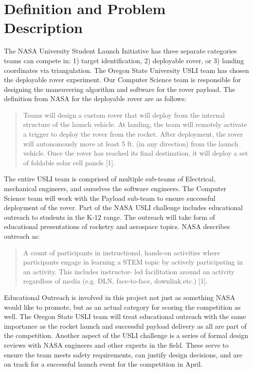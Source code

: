 \documentclass[onecolumn, draftclsnofoot,10pt, compsoc]{IEEEtran}
\begin{document}
\section{Definition and Problem Description}
The NASA University Student Launch Initiative has three separate categories teams can compete in: 1) target identification, 2) deployable
rover, or 3) landing coordinates via triangulation. The Oregon State University USLI team has chosen the deployable rover experiment. Our Computer Science team is responsible for designing the maneuvering algorithm and software for the rover payload. The definition from NASA for the deployable rover are as follows:
\begin{quote}
Teams will design a custom rover that will deploy from the internal structure of the launch
vehicle.
At landing, the team will remotely activate a trigger to deploy the rover from the rocket.
After deployment, the rover will autonomously move at least 5 ft. (in any direction) from the
launch vehicle.
Once the rover has reached its final destination, it will deploy a set of foldable solar cell panels [1].
\end{quote}

The entire USLI team is comprised of multiple sub-teams of Electrical, mechanical engineers, and ourselves the software engineers. The Computer Science team will work with the Payload sub-team to ensure successful deployment of the rover. Part of the NASA USLI challenge includes educational outreach to students in the K-12 range. The outreach will take form of educational presentations of rocketry and aerospace topics. NASA describes outreach as: 
\begin{quote}
 A count of participants in instructional, hands-on activities where participants engage in learning
a STEM topic by actively participating in an activity. This includes instructor- led facilitation around an activity regardless of
media (e.g. DLN, face-to-face, downlink.etc.) [1].
\end{quote}
Educational Outreach is involved in this project not just as something NASA would like to promote, but as an actual category for scoring the competition as well. The Oregon State USLI team will treat educational outreach with the same importance as the rocket launch and successful payload delivery as all are part of the competition. Another aspect of the USLI challenge is a series of formal design reviews with NASA engineers and other experts in the field. These serve to ensure the team meets safety requirements, can justify design decisions, and are on track for a successful launch event for the competition in April.
\end{document}
